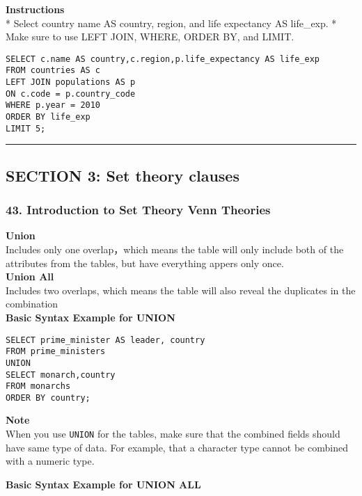 \documentclass[
]{article}
\begin{document}
\textbf{Instructions}\\
* Select country name AS country, region, and life expectancy AS
life\_exp. * Make sure to use LEFT JOIN, WHERE, ORDER BY, and LIMIT.

\begin{verbatim}
SELECT c.name AS country,c.region,p.life_expectancy AS life_exp
FROM countries AS c
LEFT JOIN populations AS p
ON c.code = p.country_code  
WHERE p.year = 2010
ORDER BY life_exp
LIMIT 5;
\end{verbatim}

\begin{center}\rule{0.5\linewidth}{0.5pt}\end{center}

\hypertarget{section-3-set-theory-clauses}{%
\subsection{SECTION 3: Set theory
clauses}\label{section-3-set-theory-clauses}}

\hypertarget{introduction-to-set-theory-venn-theories}{%
\subsubsection{43. Introduction to Set Theory Venn
Theories}\label{introduction-to-set-theory-venn-theories}}

\textbf{Union}\\
Includes only one overlap，which means the table will only include both
of the attributes from the tables, but have everything appers only
once.\\
\textbf{Union All}\\
Includes two overlaps, which means the table will also reveal the
duplicates in the combination\\
\textbf{Basic Syntax Example for UNION}

\begin{verbatim}
SELECT prime_minister AS leader, country
FROM prime_ministers
UNION
SELECT monarch,country
FROM monarchs
ORDER BY country;
\end{verbatim}

\textbf{Note}\\
When you use \texttt{UNION} for the tables, make sure that the combined
fields should have same type of data. For example, that a character type
cannot be combined with a numeric type.

\textbf{Basic Syntax Example for UNION ALL}
\end{document}
